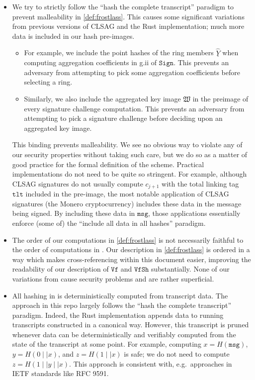 \documentclass[11pt]{article}
\theoremstyle{definition}
\newcommand{\tlt}{\texttt{tlt}}
\newcommand{\msg}{\texttt{msg}}
\newcommand{\sign}{\texttt{Sign}}
\newcommand{\verify}{\texttt{Vf}}
\newcommand{\verifyshare}{\texttt{VfSh}}
\begin{document}
\begin{itemize}
\item We try to strictly follow the ``hash the complete transcript'' paradigm to prevent malleability in \cref{def:frostlass}. This causes some significant variations from previous versions of CLSAG and the Rust implementation; much more data is included in our hash pre-images.
\begin{itemize} 
\item For example, we include the point hashes of the ring members $\underline{\widehat{Y}}$ when computing aggregation coefficients in g.ii of $\sign$. This prevents an adversary from attempting to pick some aggregation coefficients before selecting a ring. 
\item Similarly, we also include the aggregated key image $\mathfrak{W}$ in the preimage of every signature challenge computation. This prevents an adversary from attempting to pick a signature challenge before deciding upon an aggregated key image. 
\end{itemize}
This binding prevents malleability. We see no obvious way to violate any of our security properties without taking such care, but we do so as a matter of good practice for the formal definition of the scheme. Practical implementations do not need to be quite so stringent. For example, although CLSAG signatures do not usually compute $c_{j+1}$ with the total linking tag $\tlt$ included in the pre-image, the most notable application of CLSAG signatures (the Monero cryptocurrency) includes these data in the message being signed. By including these data in $\msg$, those applications essentially enforce (some of) the ``include all data in all hashes'' paradigm.

\item The order of our computations in \cref{def:frostlass} is not necessarily faithful to the order of computations in \cite{SeraiRepo}.  Our description in \cref{def:frostlass} is ordered in a way which makes cross-referencing within this document easier, improving the readability of our description of $\verify$ and $\verifyshare$ substantially. None of our variations from \cite{SeraiRepo} cause security problems and are rather superficial.

\item All hashing in \cite{SeraiRepo} is deterministically computed from transcript data. The approach in this repo largely follows the ``hash the complete transcript'' paradigm. Indeed, the Rust implementation appends data to running transcripts constructed in a canonical way.  However, this transcript is pruned whenever data can be deterministically and verifiably computed from the state of the transcript at some point. For example, computing $x = H(\msg)$, $y = H(0 \mid \mid x)$, and $z = H(1 \mid \mid x)$ is safe; we do not need to compute $z = H(1 \mid \mid y \mid \mid x)$. This approach is consistent with, e.g.\ approaches in IETF standards like RFC 9591.


\end{itemize}
\end{document}
